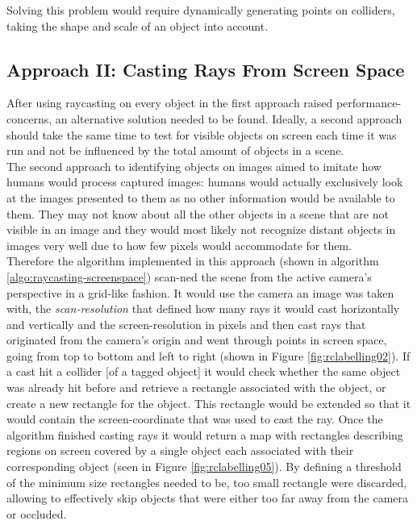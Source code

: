 Solving this problem would require dynamically generating points on colliders, taking the shape and scale of an object into account.

\subsection{Approach II: Casting Rays From Screen Space}
After using raycasting on every object in the first approach raised performance-concerns, an alternative solution needed to be found. Ideally, a second approach should take the same time to test for visible objects on screen each time it was run and not be influenced by the total amount of objects in a scene.\\
The second approach to identifying objects on images aimed to imitate how humans would process captured images: humans would actually exclusively look at the images presented to them as no other information would be available to them. They may not know about all the other objects in a scene that are not visible in an image and they would most likely not recognize distant objects in images very well due to how few pixels would accommodate for them.\\
Therefore the algorithm implemented in this approach (shown in algorithm \ref{algo:raycasting-screenspace}) scan-ned the scene from the active camera's perspective in a grid-like fashion. It would use the camera an image was taken with, the \emph{scan-resolution} that defined how many rays it would cast horizontally and vertically and the screen-resolution in pixels and then cast rays that originated from the camera's origin and went through points in screen space, going from top to bottom and left to right (shown in Figure \ref{fig:rclabelling02}). If a cast hit a collider [of a tagged object] it would check whether the same object was already hit before and retrieve a rectangle associated with the object, or create a new rectangle for the object. This rectangle would be extended so that it would contain the screen-coordinate that was used to cast the ray. Once the algorithm finished casting rays it would return a map with rectangles describing regions on screen covered by a single object each associated with their corresponding object (seen in Figure \ref{fig:rclabelling05}). By defining a threshold of the minimum size rectangles needed to be, too small rectangle were discarded, allowing to effectively skip objects that were either too far away from the camera or occluded.\\
